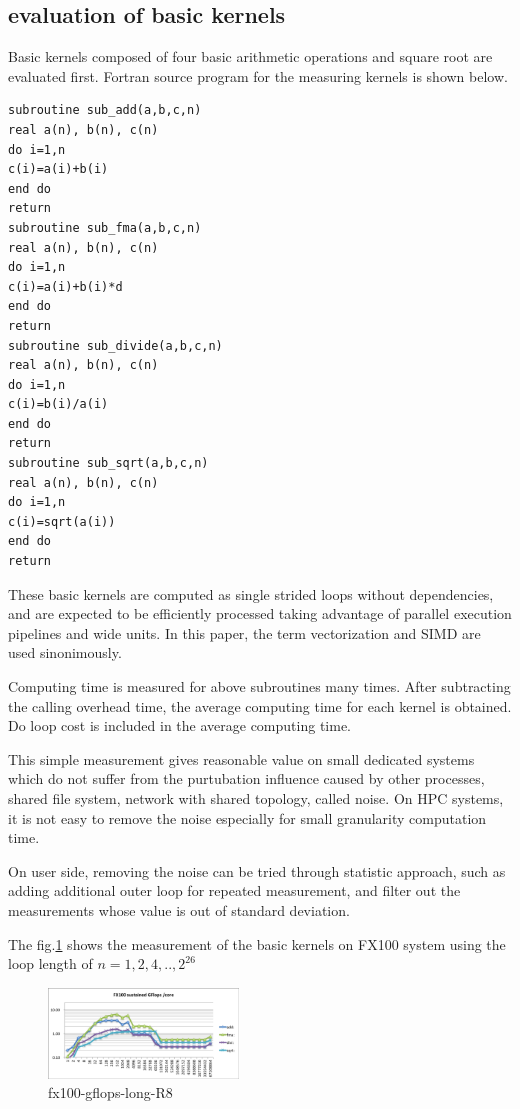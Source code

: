 \documentclass[conference]{IEEEtran}
\begin{document}
\begin{table}[b]
\end{table}


\subsection{evaluation of basic kernels}

Basic kernels composed of four basic arithmetic operations and square root
are evaluated first.
Fortran source program for the measuring kernels is shown below.

\begin{lstlisting}[caption={basic kernels}]
subroutine sub_add(a,b,c,n)
real a(n), b(n), c(n)  
do i=1,n
c(i)=a(i)+b(i)
end do
return
subroutine sub_fma(a,b,c,n)
real a(n), b(n), c(n)  
do i=1,n
c(i)=a(i)+b(i)*d
end do
return
subroutine sub_divide(a,b,c,n)
real a(n), b(n), c(n)  
do i=1,n
c(i)=b(i)/a(i)
end do
return
subroutine sub_sqrt(a,b,c,n)
real a(n), b(n), c(n)  
do i=1,n
c(i)=sqrt(a(i))
end do
return
\end{lstlisting}


These basic kernels are computed as single strided loops without dependencies,
and are expected to be efficiently processed taking advantage of parallel
execution pipelines and wide units.
In this paper, the term vectorization and SIMD are used sinonimously.

Computing time is measured for above subroutines many times.
After subtracting the calling overhead time,
the average computing time for each kernel is obtained.
Do loop cost is included in the average computing time.

This simple measurement gives reasonable value on small dedicated systems
which do not suffer from the purtubation influence caused by
other processes, shared file system, network with shared topology,
called noise.
On HPC systems, it is not easy to remove the noise
especially for small granularity computation time.

On user side, removing the noise can be tried through statistic approach,
such as
adding additional outer loop for repeated measurement, and filter out
the measurements whose value is out of standard deviation.


The fig.\ref{fig:fx100-gflops-long-R8} shows the 
measurement of the basic kernels on FX100 system using the loop length of
\begin{math}
n=1,2,4,..,2^{26}
\end{math}

\begin{figure}[bt]
\centering
\includegraphics[width=0.45\textwidth]{figs/fx100-gflops-long-R8.pdf}
\caption{fx100-gflops-long-R8}
\label{fig:fx100-gflops-long-R8}
\end{figure}
\end{document}
